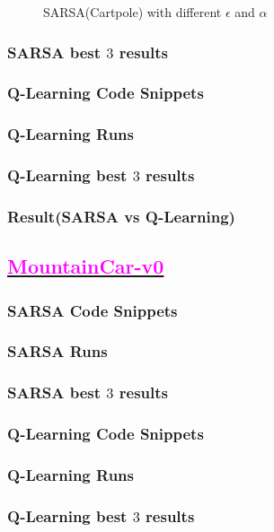 \documentclass[11pt, a4]{article}
\begin{document}
\begin{figure}[h]
				\caption{SARSA(Cartpole) with different $\epsilon$ and $\alpha$}
				\label{fig:phase_portraits}
			\end{figure}
			\subsubsection{SARSA best $3$ results}
			\subsubsection{Q-Learning Code Snippets}
			\subsubsection{Q-Learning Runs}
			\subsubsection{Q-Learning best $3$ results}
			\subsubsection{Result(SARSA vs Q-Learning)}
		\subsection{\href{https://github.com/RitabrataMandal/RL-DA6400-assignment_1/tree/main/mountain_car-v0}{\textcolor{magenta}{MountainCar-v0}}}
			\subsubsection{SARSA Code Snippets}
			\subsubsection{SARSA Runs}
			\subsubsection{SARSA best $3$ results}
			\subsubsection{Q-Learning Code Snippets}
			\subsubsection{Q-Learning Runs}
			\subsubsection{Q-Learning best $3$ results}
\end{document}
